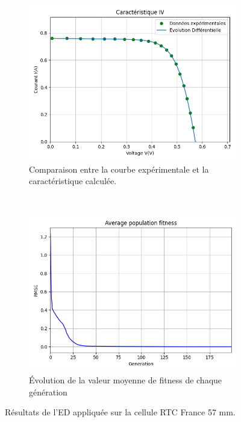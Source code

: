 \begin{figure}[t!]
    \centering
    \begin{subfigure}[b]{0.45\textwidth}
        \includegraphics[width=\textwidth]{resources/RTCFrance/singled/iv.png}
        \caption{Comparaison entre la courbe expérimentale et la caractéristique calculée.}
    \end{subfigure}
    ~
    \begin{subfigure}[b]{0.45\textwidth}
        \includegraphics[width=\textwidth]{resources/RTCFrance/singled/fitness.png}
        \caption{Évolution de la valeur moyenne de fitness de chaque génération}
    \end{subfigure}
    \caption{Résultats de l'ED appliquée sur la cellule RTC France 57 mm.}
    \label{fig:RTCres}
\end{figure}

